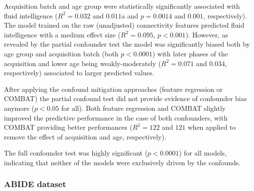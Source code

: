 \documentclass{article}
\begin{document}
Acquisition batch and age group were statistically significantly associated with fluid intelligence ($R^2=0.032$ and $0.011$a and $p=0.0014$ and $0.001$, respectively). The model trained on the raw (unadjusted) connectivity features predicted fluid intelligence with a medium effect size ($R^2=0.095$, $p<0.001$).
However, as revealed by the partial confounder test the model was significantly biased both by age group and acquisition batch (both $p<0.0001$) with later phases of the acquisition and lower age being weakly-moderately ($R^2=0.071$ and $0.034$, respectively) associated to larger predicted values.

After applying the confound mitigation approaches (feature regression or COMBAT) the partial confound test did not provide evidence of confounder bias anymore ($p < 0.05$ for all). Both feature regression and COMBAT slightly improved the predictive performance in the case of both confounders, with COMBAT providing better performances ($R^2=122$ and $121$ when applied to remove the effect of acquisition and age, respectively).

The full confounder test was highly significant ($p<0.0001$) for all models, indicating that neither of the models were exclusively driven by the confounds.

\subsubsection*{ABIDE dataset}
\end{document}
